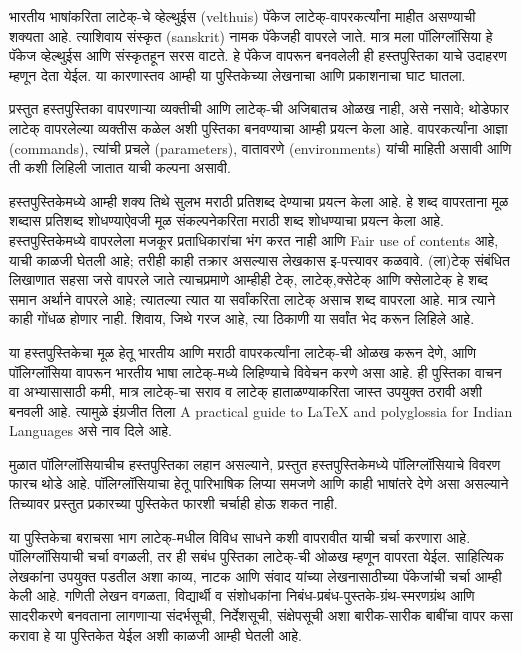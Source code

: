 \documentclass[11pt]{article}
\newcommand{\7}{\textbackslash}
\begin{document}
भारतीय भाषांकरिता लाटेक्-चे व्हेल्थुईस (velthuis) पॅकेज लाटेक्-वापरकर्त्यांना माहीत असण्याची शक्यता आहे. त्याशिवाय संस्कृत (sanskrit) नामक पॅकेजही वापरले जाते. मात्र मला पॉलिग्लॉसिया हे पॅकेज व्हेल्थुईस आणि संस्कृतहून सरस वाटते. हे पॅकेज वापरून बनवलेली ही हस्तपुस्तिका याचे उदाहरण म्हणून देता येईल. या कारणास्तव आम्ही या पुस्तिकेच्या लेखनाचा आणि प्रकाशनाचा घाट घातला.
\medskip

प्रस्तुत हस्तपुस्तिका वापरणाऱ्या व्यक्तीची आणि लाटेक्-ची अजिबातच ओळख नाही, असे नसावे; थोडेफार लाटेक् वापरलेल्या व्यक्तीस कळेल अशी पुस्तिका बनवण्याचा आम्ही प्रयत्न केला आहे. वापरकर्त्यांना आज्ञा ({\Bask commands}), त्यांची प्रचले ({\Bask parameters}), वातावरणे ({\Bask environments}) यांची माहिती असावी आणि ती कशी लिहिली जातात याची कल्पना असावी.
\medskip

हस्तपुस्तिकेमध्ये आम्ही शक्य तिथे सुलभ मराठी प्रतिशब्द देण्याचा प्रयत्न केला आहे. हे शब्द
वापरताना मूळ शब्दास प्रतिशब्द शोधण्याऐवजी मूळ संकल्पनेकरिता मराठी शब्द शोधण्याचा प्रयत्न केला आहे. हस्तपुस्तिकेमध्ये वापरलेला मजकूर प्रताधिकारांचा भंग करत नाही आणि {\Bask Fair use of contents} आहे, याची काळजी घेतली आहे; तरीही काही तक्रार असल्यास लेखकास इ-पत्त्यावर कळवावे. (ला)टेक् संबंधित लिखाणात सहसा जसे वापरले जाते त्याचप्रमाणे आम्हीही टेक्, लाटेक्,क्सेटेक् आणि क्सेलाटेक् हे शब्द समान अर्थाने वापरले आहे; त्यातल्या त्यात या सर्वांकरिता लाटेक् असाच शब्द वापरला आहे. मात्र त्याने काही गोंधळ होणार नाही. शिवाय, जिथे गरज आहे, त्या ठिकाणी या सर्वांत भेद करून लिहिले आहे.
\medskip

या हस्तपुस्तिकेचा मूळ हेतू भारतीय आणि मराठी वापरकर्त्यांना लाटेक्-ची ओळख करून देणे, आणि पॉलिग्लॉसिया वापरून भारतीय भाषा लाटेक्-मध्ये लिहिण्याचे विवेचन करणे असा आहे. ही पुस्तिका वाचन वा अभ्यासासाठी कमी, मात्र लाटेक्-चा सराव व लाटेक् हाताळण्याकरिता जास्त उपयुक्त ठरावी अशी बनवली आहे. त्यामुळे इंग्रजीत तिला {\Bask A practical guide to {\LaTeX} and polyglossia for Indian Languages} असे नाव दिले आहे.
\medskip

मुळात पॉलिग्लॉसियाचीच हस्तपुस्तिका लहान असल्याने, प्रस्तुत हस्तपुस्तिकेमध्ये पॉलिग्लॉसियाचे विवरण फारच थोडे आहे. पॉलिग्लॉसियाचा हेतू पारिभाषिक लिप्या समजणे आणि काही भाषांतरे देणे असा असल्याने तिच्यावर प्रस्तुत प्रकारच्या पुस्तिकेत फारशी चर्चाही होऊ शकत नाही.
\medskip

 या पुस्तिकेचा बराचसा भाग लाटेक्-मधील विविध साधने कशी वापरावीत याची चर्चा करणारा आहे. पॉलिग्लॉसियाची चर्चा वगळली, तर ही सबंध पुस्तिका लाटेक्-ची ओळख म्हणून वापरता येईल. साहित्यिक लेखकांना उपयुक्त पडतील अशा काव्य, नाटक आणि संवाद यांच्या लेखनासाठीच्या पॅकेजांची चर्चा आम्ही केली आहे. गणिती लेखन वगळता, विद्यार्थी व संशोधकांना निबंध-प्रबंध-पुस्तके-ग्रंथ-स्मरणग्रंथ आणि सादरीकरणे बनवताना लागणाऱ्या संदर्भसूची, निर्देशसूची, संक्षेपसूची अशा बारीक-सारीक बाबींचा वापर कसा करावा हे या पुस्तिकेत येईल अशी काळजी आम्ही घेतली आहे.
\medskip
\end{document}
